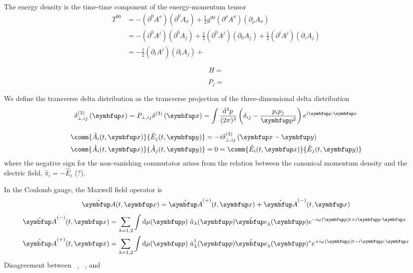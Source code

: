 The energy density is the time-time component of the energy-momentum tensor
\begin{equation}
	\begin{split}
		T^{00}
		&=
		-
		\left(
			\partial^0
			A^\sigma
		\right)
		\left(
			\partial^0
			A_\sigma
		\right)
		+
		\frac{1}{2}
		g^{00}
		\left(
			\partial^\rho
			A^\sigma
		\right)
		\left(
			\partial_\rho
			A_\sigma
		\right)
		\\
		&=
		-
		\left(
			\partial^0
			A^j
		\right)
		\left(
			\partial^0
			A_j
		\right)
		+
		\frac{1}{2}
		\left(
			\partial^0
			A^j
		\right)
		\left(
			\partial_0
			A_j
		\right)
		+
		\frac{1}{2}
		\left(
			\partial^i
			A^j
		\right)
		\left(
			\partial_i
			A_j
		\right)
		\\
		&=
		-
		\frac{1}{2}
		\left(
			\partial_t
			A^j
		\right)
		\left(
			\partial_t
			A_j
		\right)
		+
	\end{split}
\end{equation}

\begin{equation}
	H
	=
\end{equation}

\begin{equation}
	P_j
	=
\end{equation}

We define the transverse delta distribution as the transverse projection of the three-dimensional delta distribution
\begin{equation}
	\delta_{\perp,ij}^{(3)}
	\left(\vb{x}\right)
	=
	P_{\perp,ij}
	\delta^{(3)}
	\left(\vb{x}\right)
	=
	\int\frac{\dd[3]{p}}{(2\pi)^3}
	\left(
		\delta_{ij}
		-
		\frac{p_ip_j}{\vb{p}^2}
	\right)
	e^{i\vb{p}\vdot\vb{x}}
\end{equation}

\begin{align}
	\comm{\hat{A}_i(t,\vb{x})}{\hat{E}_j(t,\vb{y})}
	&=
	-i
	\delta_{\perp,ij}^{(3)}
	\left(\vb{x}-\vb{y}\right)
	\\
	\comm{\hat{A}_i(t,\vb{x})}{\hat{A}_j(t,\vb{y})}
	&=
	0
	=
	\comm{\hat{E}_i(t,\vb{x})}{\hat{E}_j(t,\vb{y})}
\end{align}
where the negative sign for the non-vanishing commutator arises from the relation between the canonical momentum density and the electric field, $\hat\pi_i=-\hat{E}_i$ (?).

In the Coulomb gauge, the Maxwell field operator is
\begin{equation}
	\vu{A}(t,\vb{x})
	=
	\vu{A}^{(+)}(t,\vb{x})
	+
	\vu{A}^{(-)}(t,\vb{x})
\end{equation}
\begin{align}
	\vu{A}^{(-)}(t,\vb{x})
	&=
	\sum_{\lambda=1,2}
	\int\dd{\mu(\vb{p})}
	\hat{a}_\lambda(\vb{p})
	\vu{e}_\lambda(\vb{p})
	e^{-i\omega(\vb{p})t+i\vb{p}\vdot\vb{x}}
	\\
	\vu{A}^{(+)}(t,\vb{x})
	&=
	\sum_{\lambda=1,2}
	\int\dd{\mu(\vb{p})}
	\hat{a}_\lambda^\dagger(\vb{p})
	\vu{e}_\lambda(\vb{p})^*
	e^{+i\omega(\vb{p})t-i\vb{p}\vdot\vb{x}}
\end{align}
Disagreement between ~\cite[p.~341]{Srednicki2007}, ~\cite[p.~198]{Greiner2013}, and \cite[p.~123]{Peskin1995}

